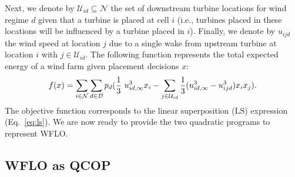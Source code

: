 \documentclass[preprint,12pt]{elsarticle}
\begin{document}
Next, we denote by $\mathcal{U}_{id} \subseteq \mathcal{N}$ 
the set of downstream 
turbine locations for wind regime $d$
given that a turbine is placed at cell $i$ (i.e., turbines placed in these locations 
will be influenced by a turbine placed in $i$). Finally,
we denote by $u_{ijd}$ the wind speed at location $j$ due to a single wake from upstream turbine at location $i$ with $j \in \mathcal{U}_{id}$. 
The following function  
represents the total expected energy of a wind farm given placement decisions 
$x$: \begin{equation}
f(x) = \sum_{i \in \mathcal{N}}^{} \sum_{d \in \mathcal{D}}^{} p_d ( \frac{1}{3} \ u_{id, \infty}^3 x_i  - \sum_{j \in \mathcal{U}_{id}}^{} \frac{1}{3}(u_{id, \infty} ^3 - u_{ijd}^3)x_i x_j).   \label{ObjFunc}\\
\end{equation} The objective function corresponds to the linear superposition (LS)
expression (Eq.~\ref{eq:ls}). We are now ready to provide the two quadratic programs to represent WFLO.

\subsection{WFLO as QCOP}
\end{document}
